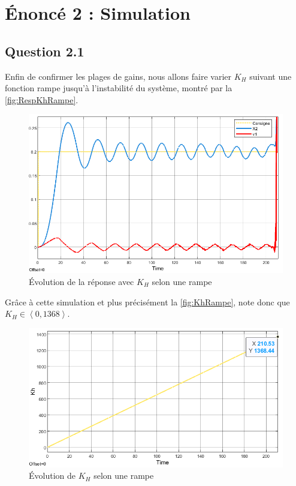 \documentclass[a4paper,12pt]{article}
\begin{document}
    \newpage
    \section{Énoncé 2 : Simulation}
    \subsection{Question 2.1}
    Enfin de confirmer les plages de gains, nous allons faire varier $K_H$ suivant une fonction rampe jusqu'à l'instabilité du système, montré par la \autoref{fig:RespKhRampe}.
    \begin{figure}[H]
        \centering
        \includegraphics[width=16cm]{./img/response_KhRampe.png}
        \caption{Évolution de la réponse avec $K_H$ selon une rampe\label{fig:RespKhRampe}}
    \end{figure}
    Grâce à cette simulation et plus précisément la \autoref{fig:KhRampe},  note donc que $K_H \in \left< 0, 1368 \right>$.
    \begin{figure}[H]
        \centering
        \includegraphics[width=15cm]{./img/Kh_Evolution_Rampe.png}
        \caption{Évolution de $K_H$ selon une rampe\label{fig:KhRampe}}
    \end{figure}
    
\end{document}
